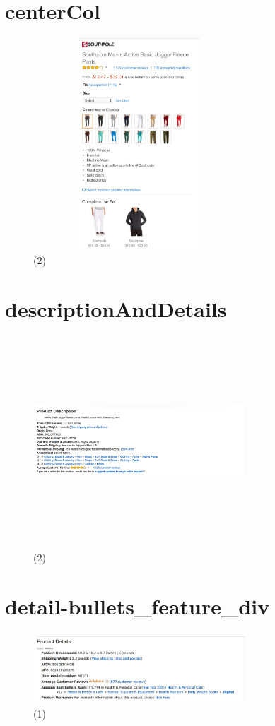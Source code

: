 \documentclass[12pt]{article}
\begin{document}
\section*{centerCol}
\begin{figure}[htp]
\centering
\includegraphics[width=300px,height=300px]{images/centerCol(2).png}
\caption{(2)}
\end{figure}

\pagebreak

\section*{descriptionAndDetails}
\begin{figure}[htp]
\centering
\includegraphics[width=300px,height=300px]{images/descriptionAndDetails(2).png}
\caption{(2)}
\end{figure}

\pagebreak
\section*{detail-bullets\_feature\_div}
\begin{figure}[htp]
\centering
\includegraphics[width=300px,height=100px]{images/detail-bullets_feature_div(1).png}
\caption{(1)}
\end{figure}
\end{document}
